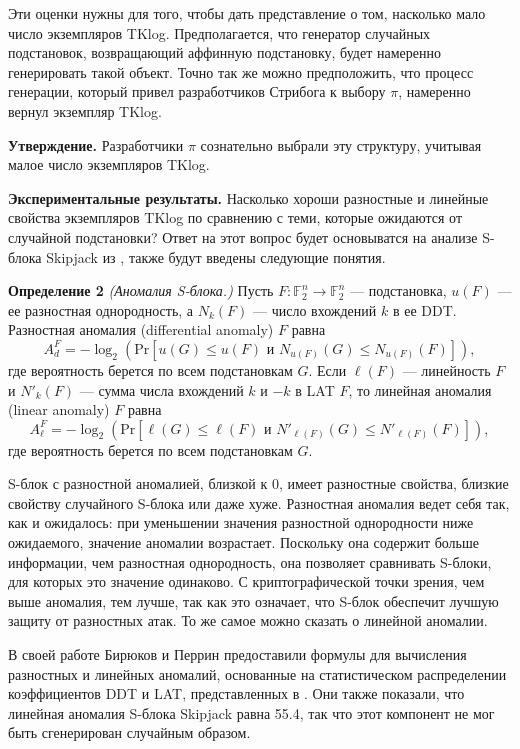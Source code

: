 Эти оценки нужны для того, чтобы дать представление о том, насколько мало число экземпляров TKlog. Предполагается, что генератор случайных подстановок, возвращающий аффинную подстановку, будет намеренно генерировать такой объект. Точно так же можно предположить, что процесс генерации, который привел разработчиков Стрибога к выбору \(\pi\), намеренно вернул экземпляр TKlog.

\textbf{Утверждение.} Разработчики \(\pi\) сознательно выбрали эту структуру, учитывая малое число экземпляров TKlog.

\textbf{Экспериментальные результаты.} Насколько хороши разностные и линейные свойства экземпляров TKlog по сравнению с теми, которые ожидаются от случайной подстановки? Ответ на этот вопрос будет основыватся на анализе S-блока Skipjack из \cite{BP15}, также будут введены следующие понятия.

\textbf{Определение 2} \textit{(Аномалия S-блока.)} Пусть \(F : \mathbb{F}_2^n \to \mathbb{F}_2^n\) — подстановка, \(u(F)\) — ее разностная однородность, а \(N_k(F)\) — число вхождений \(k\) в ее DDT. Разностная аномалия (differential anomaly) \(F\) равна
\[
A_d^F = -\log_2(\mathrm{Pr}[u(G) \leq u(F) \text{ и } N_{u(F)}(G) \leq N_{u(F)}(F)]),
\]
где вероятность берется по всем подстановкам \(G\). Если \(\ell(F)\) — линейность \(F\) и \(N'_k(F)\) — сумма числа вхождений \(k\) и \(-k\) в LAT \(F\), то линейная аномалия (linear anomaly) \(F\) равна
\[
A_\ell^F = -\log_2(\mathrm{Pr}[\ell(G) \leq \ell(F) \text{ и } N'_{\ell(F)}(G) \leq N'_{\ell(F)}(F)]),
\]
где вероятность берется по всем подстановкам \(G\).

S-блок с разностной аномалией, близкой к 0, имеет разностные свойства, близкие свойству случайного S-блока или даже хуже. Разностная аномалия ведет себя так, как и ожидалось: при уменьшении значения разностной однородности ниже ожидаемого, значение аномалии возрастает. Поскольку она содержит больше информации, чем разностная однородность, она позволяет сравнивать S-блоки, для которых это значение одинаково. С криптографической точки зрения, чем выше аномалия, тем лучше, так как это означает, что S-блок обеспечит лучшую защиту от разностных атак. То же самое можно сказать о линейной аномалии.

В своей работе \cite{BP15} Бирюков и Перрин предоставили формулы для вычисления разностных и линейных аномалий, основанные на статистическом распределении коэффициентов DDT и LAT, представленных в \cite{DR07}. Они также показали, что линейная аномалия S-блока Skipjack равна 55.4, так что этот компонент не мог быть сгенерирован случайным образом.

